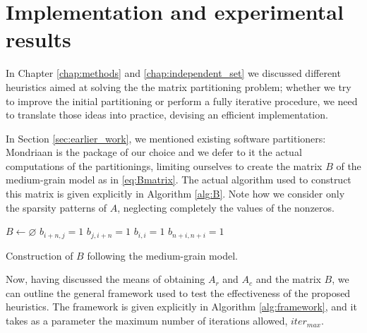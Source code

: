 \chapter{Implementation and experimental results} \label{chap:experimental_results}

In Chapter \ref{chap:methods} and \ref{chap:independent_set} we discussed different heuristics aimed at solving the the matrix partitioning problem; whether we try to improve the initial partitioning or perform a fully iterative procedure, we need to translate those ideas into practice, devising an efficient implementation.

In Section \ref{sec:earlier_work}, we mentioned existing software partitioners: Mondriaan \cite{mondriaan} is the package of our choice and we defer to it the actual computations of the partitionings, limiting ourselves to create the matrix $B$ of the medium-grain model as in \eqref{eq:Bmatrix}. The actual algorithm used to construct this matrix is given explicitly in Algorithm \ref{alg:B}. Note how we consider only the sparsity patterns of $A$, neglecting completely the values of the nonzeros.

\begin{algorithm}[h]
	\begin{algorithmic}
		\State $B \gets \varnothing$
		 
		\State $b_{i+n,j} = 1$
		\EndFor
		 
		\State $b_{j,i+n} = 1$
		\EndFor
		 
		\State $b_{i,i} = 1$
		\EndIf
		\EndFor
		 
		\State $b_{n+i,n+i} = 1$
		\EndIf
		\EndFor
	\end{algorithmic}
	\caption{Construction of $B$ following the medium-grain model.} \label{alg:B}
\end{algorithm}

Now, having discussed the means of obtaining $A_r$ and $A_c$ and the matrix $B$, we can outline the general framework used to test the effectiveness of the proposed heuristics. The framework is given explicitly in Algorithm \ref{alg:framework}, and it takes as a parameter the maximum number of iterations allowed, $iter_{max}$.  

